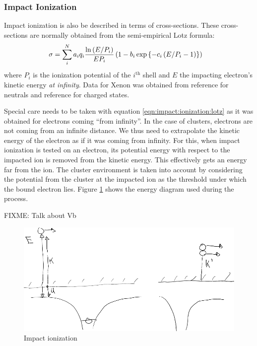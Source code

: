 \subsubsection{Impact Ionization}
Impact ionization is also be described in terms of cross-sections. These
cross-sections are normally obtained from the semi-empirical Lotz
formula\cite{Lotz1967}:
\begin{align}
\sigma & = \sum_{i}^{N} a_i q_i \frac{\ln{\left( E/P_i \right)}}{E P_i} \left( 1 - b_i
\exp{ \left\{ -c_i \left( E/P_i - 1 \right) \right\}} \right)
\label{eqn:impact:ionization:lotz}
\end{align}
where $P_i$ is the ionization potential of the $i^{\textrm{th}}$ shell and $E$
the impacting electron's kinetic energy \textit{at infinity}.
Data for Xenon was obtained from reference \cite{Tawara1987} for neutrals
and reference \cite{Heidenreich2005} for charged states.

Special care needs to be taken with equation \eqref{eqn:impact:ionization:lotz}
as it was obtained for electrons coming ``from infinity''. In the case of
clusters, electrons are not coming from an infinite distance. We thus need to
extrapolate the kinetic energy of the electron as if it was coming from
infinity. For this, when impact ionization is tested on an electron, its
potential energy with respect to the impacted ion is removed from the kinetic
energy. This effectively gets an energy far from the ion. The cluster
environment is taken into account by considering the potential from the cluster
at the impacted ion as the threshold under which the bound electron lies.
Figure \ref{fig:ionization:impact} shows the energy diagram used during the
process.

FIXME: Talk about Vb

\begin{figure}
 \centering
 \includegraphics[width=0.76\columnwidth]{figures/mockups/ionization_impact}
 \caption{Impact ionization}
 \label{fig:ionization:impact}
\end{figure}


